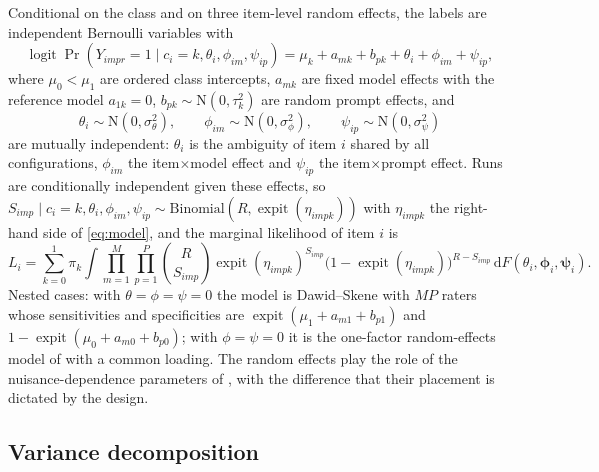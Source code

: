 Conditional on the class and on three item-level random effects, the labels are
independent Bernoulli variables with
\begin{equation}\label{eq:model}
  \operatorname{logit} \Pr(Y_{impr} = 1 \mid c_i = k, \theta_i, \phi_{im}, \psi_{ip})
  = \mu_k + a_{mk} + b_{pk} + \theta_i + \phi_{im} + \psi_{ip},
\end{equation}
where $\mu_0 < \mu_1$ are ordered class intercepts, $a_{mk}$ are fixed model effects with
the reference model $a_{1k} = 0$, $b_{pk} \sim \mathrm{N}(0, \tau_k^2)$ are random prompt
effects, and
\begin{equation}\label{eq:re}
  \theta_i \sim \mathrm{N}(0, \sigma_\theta^2), \qquad
  \phi_{im} \sim \mathrm{N}(0, \sigma_\phi^2), \qquad
  \psi_{ip} \sim \mathrm{N}(0, \sigma_\psi^2)
\end{equation}
are mutually independent: $\theta_i$ is the ambiguity of item $i$ shared by all
configurations, $\phi_{im}$ the item$\times$model effect and $\psi_{ip}$ the
item$\times$prompt effect. Runs are conditionally independent given these effects, so
$S_{imp} \mid c_i = k, \theta_i, \phi_{im}, \psi_{ip} \sim \mathrm{Binomial}(R,
\operatorname{expit}(\eta_{impk}))$ with $\eta_{impk}$ the right-hand side of
\eqref{eq:model}, and the marginal likelihood of item $i$ is
\begin{equation}\label{eq:lik}
  L_i = \sum_{k=0}^{1} \pi_k \int \prod_{m=1}^{M} \prod_{p=1}^{P}
  \binom{R}{S_{imp}} \operatorname{expit}(\eta_{impk})^{S_{imp}}
  \bigl(1 - \operatorname{expit}(\eta_{impk})\bigr)^{R - S_{imp}} \,
  \mathrm{d}F(\theta_i, \boldsymbol{\phi}_i, \boldsymbol{\psi}_i).
\end{equation}
Nested cases: with $\theta = \phi = \psi = 0$ the model is Dawid--Skene with $M P$
raters whose sensitivities and specificities are $\operatorname{expit}(\mu_1 + a_{m1} +
b_{p1})$ and $1 - \operatorname{expit}(\mu_0 + a_{m0} + b_{p0})$; with $\phi = \psi = 0$
it is the one-factor random-effects model of \citet{Qu1996} with a common loading. The
random effects play the role of the nuisance-dependence parameters of \citet{Oberski2016},
with the difference that their placement is dictated by the design.

\subsection{Variance decomposition}

